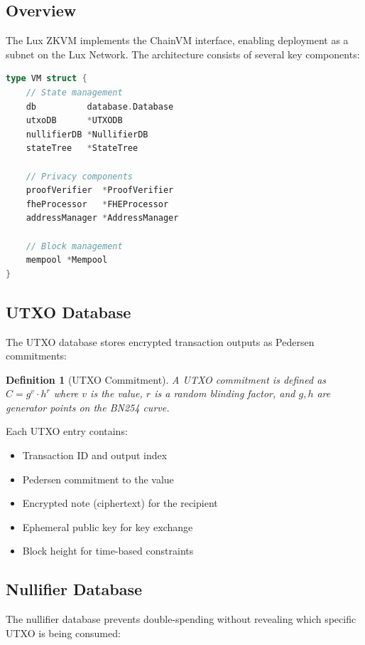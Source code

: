\documentclass[11pt,a4paper]{article}
\newtheorem{definition}{Definition}
\begin{document}
\subsection{Overview}

The Lux ZKVM implements the ChainVM interface, enabling deployment as a subnet on the Lux Network. The architecture consists of several key components:

\begin{lstlisting}[language=Go,caption={ZKVM Core Structure}]
type VM struct {
    // State management
    db          database.Database
    utxoDB      *UTXODB
    nullifierDB *NullifierDB
    stateTree   *StateTree

    // Privacy components
    proofVerifier  *ProofVerifier
    fheProcessor   *FHEProcessor
    addressManager *AddressManager

    // Block management
    mempool *Mempool
}
\end{lstlisting}

\subsection{UTXO Database}

The UTXO database stores encrypted transaction outputs as Pedersen commitments:

\begin{definition}[UTXO Commitment]
A UTXO commitment is defined as $C = g^v \cdot h^r$ where $v$ is the value, $r$ is a random blinding factor, and $g, h$ are generator points on the BN254 curve.
\end{definition}

Each UTXO entry contains:
\begin{itemize}
    \item Transaction ID and output index
    \item Pedersen commitment to the value
    \item Encrypted note (ciphertext) for the recipient
    \item Ephemeral public key for key exchange
    \item Block height for time-based constraints
\end{itemize}

\subsection{Nullifier Database}

The nullifier database prevents double-spending without revealing which specific UTXO is being consumed:
\end{document}
